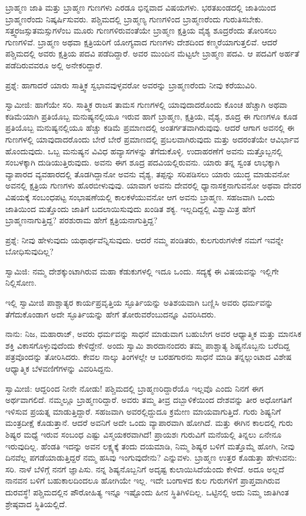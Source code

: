 ಬ್ರಾಹ್ಮಣ ಜಾತಿ ಮತ್ತು ಬ್ರಾಹ್ಮಣ ಗುಣಗಳು ಎರಡೂ ಭಿನ್ನವಾದ ವಿಷಯಗಳು. ಭರತಖಂಡದಲ್ಲಿ ಜಾತಿಯಿಂದ ಬ್ರಾಹ್ಮಣರೆಂದು ನಿಷ್ಕರ್ಷಿಸುವರು. ಪಶ್ಚಿಮದಲ್ಲಿ ಬ್ರಾಹ್ಮಣ್ಯ ಗುಣಗಳಿಂದ ಬ್ರಾಹ್ಮಣರೆಂದು ಗುರುತಿಸಬೇಕು. ಸತ್ತ್ವರಜಸ್ಸುತಮಸ್ಸುಗಳೆಂಬ ಮೂರು ಗುಣಗಳಿರುವಂತೆಯೇ ಬ್ರಾಹ್ಮಣ ಕ್ಷತ್ರಿಯ ವೈಶ್ಯ ಶೂದ್ರರೆಂದು ತೋರಿಸಲು ಗುಣಗಳಿವೆ. ಬ್ರಾಹ್ಮಣ ಅಥವಾ ಕ್ಷತ್ರಿಯರಿಗೆ ಯೋಗ್ಯವಾದ ಗುಣಗಳು ದೇಶದಿಂದ ಕಣ್ಮರೆಯಾಗುತ್ತಲಿವೆ. ಆದರೆ ಪಶ್ಚಿಮದಲ್ಲಿ ಅವರು ಕ್ಷತ್ರಿಯ ಪದವಿ ಪಡೆದಿದ್ದಾರೆ. ಅವರ ಮುಂದಿನ ಮೆಟ್ಟಲೇ ಬ್ರಾಹ್ಮಣ ಪದವಿ. ಆ ಪದವಿಗೆ ಅರ್ಹತೆ ಪಡೆದಿರುವವರೂ ಅಲ್ಲಿ ಅನೇಕರಿದ್ದಾರೆ.

ಪ್ರಶ್ನೆ: ಹಾಗಾದರೆ ಯಾರು ಸಾತ್ತ್ವಿಕ ಸ್ವಭಾವವುಳ್ಳವರೋ ಅವರನ್ನು ಬ್ರಾಹ್ಮಣರೆಂದು ನೀವು ಕರೆಯುವಿರಿ.

ಸ್ವಾಮೀಜಿ: ಹಾಗೆಯೇ ಸರಿ. ಸಾತ್ತ್ವಿಕ ರಾಜಸ ತಾಮಸ ಗುಣಗಳಲ್ಲಿ ಯಾವುದಾದರೊಂದು ಕೊಂಚ ಹೆಚ್ಚಾಗಿ ಅಥವಾ ಕಡಿಮೆಯಾಗಿ ಪ್ರತಿಯೊಬ್ಬ ಮನುಷ್ಯನಲ್ಲಿಯೂ ಇರುವ ಹಾಗೆ ಬ್ರಾಹ್ಮಣ, ಕ್ಷತ್ರಿಯ, ವೈಶ್ಯ, ಶೂದ್ರ ಈ ಗುಣಗಳೂ ಕೂಡ ಪ್ರತಿಯೊಬ್ಬ ಮನುಷ್ಯನಲ್ಲಿಯೂ ಹೆಚ್ಚು ಕಡಿಮೆ ಪ್ರಮಾಣದಲ್ಲಿ ಅಂತರ್ಗತವಾಗಿರುವುವು. ಆದರೆ ಆಗಾಗ ಅವನಲ್ಲಿ ಈ ಗುಣಗಳಲ್ಲಿ ಯಾವುದಾದರೊಂದು ಬೇರೆ ಬೇರೆ ಪ್ರಮಾಣದಲ್ಲಿ ಪ್ರಬಲವಾಗಿರುವುದು ಮತ್ತು ಅದರಂತೆಯೇ ಆವಿರ್ಭಾವ ಹೊಂದುವುದು. ಒಬ್ಬ ಮನುಷ್ಯನ ವಿವಿಧ ಹವ್ಯಾಸಗಳನ್ನು ತೆಗೆದುಕೊಳ್ಳಿ. ಉದಾಹರಣೆಗೆ ಅವನು ಮತ್ತೊಬ್ಬನಲ್ಲಿ ಸಂಬಳಕ್ಕಾಗಿ ದುಡಿಯುತ್ತಿರುವುದು. ಅವನು ಈಗ ಶೂದ್ರ ಪದವಿಯಲ್ಲಿರುವನು. ಯಾರು ತನ್ನ ಸ್ವಂತ ಲಾಭಕ್ಕಾಗಿ ವ್ಯಾಪಾರದ ವ್ಯವಹಾರದಲ್ಲಿ ತೊಡಗಿದ್ದಾನೋ ಅವನು ವೈಶ್ಯ, ತಪ್ಪನ್ನು ಸರಿಪಡಿಸಲು ಯಾರು ಯುದ್ಧ ಮಾಡುವನೋ ಅವನಲ್ಲಿ ಕ್ಷತ್ರಿಯ ಗುಣಗಳು ಹೊರಬೀಳುವುವು. ಯಾವಾಗ ಅವನು ದೇವರಲ್ಲಿ ಧ್ಯಾನಾಸಕ್ತನಾಗುವನೋ ಅಥವಾ ದೇವರ ವಿಷಯಕ್ಕೆ ಸಂಬಂಧಪಟ್ಟ ಸಂಭಾಷಣೆಯಲ್ಲಿ ಕಾಲಕಳೆಯುವನೋ ಆಗ ಅವನು ಬ್ರಾಹ್ಮಣ. ಸಹಜವಾಗಿ ಒಂದು ಜಾತಿಯಿಂದ ಮತ್ತೊಂದು ಜಾತಿಗೆ ಬದಲಾಯಿಸುವುದು ಖಂಡಿತ ಶಕ್ಯ. ಇಲ್ಲದಿದ್ದಲ್ಲಿ ವಿಶ್ವಾಮಿತ್ರ ಹೇಗೆ ಬ್ರಾಹ್ಮಣನಾಗುತ್ತಿದ್ದ? ಪರಶುರಾಮ ಹೇಗೆ ಕ್ಷತ್ರಿಯನಾಗುತ್ತಿದ್ದ?

ಪ್ರಶ್ನೆ: ನೀವು ಹೇಳುವುದು ಯಥಾರ್ಥವೆನ್ನಿಸುವುದು. ಆದರೆ ನಮ್ಮ ಪಂಡಿತರು, ಕುಲಗುರುಗಳೇಕೆ ನಮಗೆ ಇವನ್ನೇ ಬೋಧಿಸುವುದಿಲ್ಲ?

ಸ್ವಾಮಿಜಿ: ನಮ್ಮ ದೇಶಕ್ಕುಂಟಾಗಿರುವ ಮಹಾ ಕೆಡುಕುಗಳಲ್ಲಿ ಇದೂ ಒಂದು. ಸದ್ಯಕ್ಕೆ ಈ ವಿಷಯವನ್ನು ಇಲ್ಲಿಗೇ ನಿಲ್ಲಿಸೋಣ.

ಇಲ್ಲಿ ಸ್ವಾಮೀಜಿ ಪಾಶ್ಚಾತ್ಯರ ಕಾರ್ಯಪ್ರವೃತ್ತಿಯ ಸ್ಫೂರ್ತಿಯನ್ನು ಅತಿಶಯವಾಗಿ ಬಣ್ಣಿಸಿ ಅವರು ಧರ್ಮವನ್ನು ತೆಗೆದುಕೊಂಡಾಗ ಅದೇ ಸ್ಫೂರ್ತಿಯನ್ನು ಹೇಗೆ ತೋರುವರೆಂಬುದನ್ನೂ ವಿವರಿಸಿದರು.

ನಾನು: ನಿಜ, ಮಹಾರಾಜ್, ಅವರು ಧರ್ಮವನ್ನು ಸಾಧನೆ ಮಾಡುವಾಗ ಬಹುಬೇಗ ಅವರ ಆಧ್ಯಾತ್ಮಿಕ ಮತ್ತು ಮಾನಸಿಕ ಶಕ್ತಿ ವಿಕಾಸಗೊಳ್ಳುವುದೆಂದು ಕೇಳಿದ್ದೇನೆ. ಅಂದು ಸ್ವಾಮಿ ಶಾರದಾನಂದರು ತಮ್ಮ ಪಾಶ್ಚಾತ್ಯ ಶಿಷ್ಯನೊಬ್ಬನು ಬರೆದಿದ್ದ ಪತ್ರವೊಂದನ್ನು ತೋರಿಸಿದರು. ಕೇವಲ ನಾಲ್ಕು ತಿಂಗಳಲ್ಲೇ ಆ ಬರಹಗಾರನು ಸಾಧನೆ ಮಾಡಿ ತನ್ನಲ್ಲುಂಟಾದ ವಿಶೇಷ ಆಧ್ಯಾತ್ಮಿಕ ಬೆಳವಣಿಗೆಗಳನ್ನು ವಿವರಿಸಿದ್ದನು.

ಸ್ವಾಮೀಜಿ: ಆದ್ದರಿಂದ ನೀನೇ ನೋಡು! ಪಶ್ಚಿಮದಲ್ಲಿ ಬ್ರಾಹ್ಮಣರಿದ್ದಾರೆಯೊ ಇಲ್ಲವೊ ಎಂದು ನಿನಗೆ ಈಗ ಅರ್ಥವಾಗಲಿದೆ. ನಮ್ಮಲ್ಲೂ ಬ್ರಾಹ್ಮಣರಿದ್ದಾರೆ. ಅವರು ತಮ್ಮ ತೀವ್ರ ದಬ್ಬಾಳಿಕೆಯಿಂದ ದೇಶವನ್ನು ತೀರ ಅಧೋಗತಿಗೆ ಇಳಿಸುವ ಪ್ರಯತ್ನ ಮಾಡುತ್ತಿದ್ದಾರೆ. ಸಹಜವಾಗಿ ಅವರಲ್ಲಿದ್ದುದೂ ಕ್ರಮೇಣ ಮಾಯವಾಗುತ್ತಿದೆ. ಗುರು ಶಿಷ್ಯನಿಗೆ ಮಂತ್ರದೀಕ್ಷೆ ಕೊಡುತ್ತಾನೆ. ಆದರೆ ಅವನಿಗೆ ಅದೇ ಒಂದು ವ್ಯಾಪಾರವಾಗಿ ಹೋಗಿದೆ. ಮತ್ತು ಈಗಿನ ಕಾಲದಲ್ಲಿ ಗುರು ಶಿಷ್ಯರ ಮಧ್ಯೆ ಇರುವ ಸಂಬಂಧ ಎಷ್ಟು ವಿಸ್ಮಯಕರವಾಗಿದೆ! ಪ್ರಾಯಶಃ ಗುರುವಿಗೆ ಮನೆಯಲ್ಲಿ ತಿನ್ನಲು ಏನೇನೂ ಇರುವುದಿಲ್ಲ. ಹೆಂಡತಿ ಇದನ್ನು ಅವನ ಲಕ್ಷ್ಯಕ್ಕೆ ತಂದು ದಯಮಾಡಿ, ನಿಮ್ಮ ಶಿಷ್ಯರ ಬಳಿಗೆ ಮತ್ತೊಮ್ಮೆ ಹೋಗಿ, ನೀವು ದಿನವೆಲ್ಲ ಪಗಡೆಯಾಡುತ್ತಿದ್ದರೆ ನಮ್ಮ ಹಸಿವು ಇಂಗುವುದೇನು? ಎನ್ನುವಳು. ಬ್ರಾಹ್ಮಣ ಉತ್ತರ ಕೊಡುತ್ತಾ ಹೇಳುವನು: ಸರಿ. ನಾಳೆ ಬೆಳಿಗ್ಗೆ ನನಗೆ ಜ್ಞಾಪಿಸು. ನನ್ನ ಶಿಷ್ಯನೊಬ್ಬನಿಗೆ ಅದೃಷ್ಟ ಕುಲಾಯಿಸಿದೆಯೆಂದು ಕೇಳಿದೆ. ಅದೂ ಅಲ್ಲದೆ ನಾನವನ ಬಳಿಗೆ ಬಹುಕಾಲದಿಂದಲೂ ಹೋಗಿಯೇ ಇಲ್ಲ. ಇದೇ ಬಂಗಾಳದ ಕುಲ ಗುರುಗಳಿಗೆ ಪ್ರಾಪ್ತವಾಗಿರುವ ದುರವಸ್ಥೆ! ಪಶ್ಚಿಮದಲ್ಲಿನ ಪೌರೋಹಿತ್ಯ ಇನ್ನೂ ಇಷ್ಟೊಂದು ಹೀನ ಸ್ಥಿತಿಗಿಳಿದಿಲ್ಲ. ಒಟ್ಟಿನಲ್ಲಿ ಅದು ನಿಮ್ಮ ಜಾತಿಗಿಂತ ಶ್ರೇಷ್ಠವಾದ ಸ್ಥಿತಿಯಲ್ಲಿದೆ.

